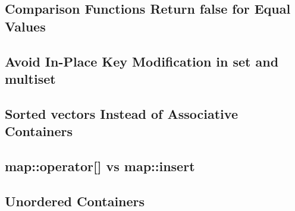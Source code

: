 \subsection{Comparison Functions Return false for Equal Values}

\subsection{Avoid In-Place Key Modification in set and multiset}

\subsection{Sorted vectors Instead of Associative Containers}

\subsection{map::operator[] vs map::insert}

\subsection{Unordered Containers}
